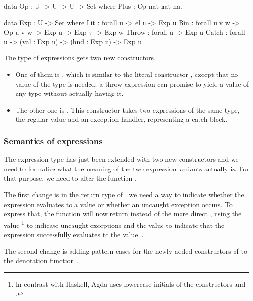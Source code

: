 \begin{code}
  data Op : U -> U -> U -> Set where
    Plus : Op nat nat nat
\end{code}

\begin{code}
  data Exp : U -> Set where
    Lit : forall {u} -> el u -> Exp u
    Bin : forall {u v w} -> Op u v w -> Exp u -> Exp v -> Exp w
    Throw : forall {u} -> Exp u
    Catch : forall {u} -> (val : Exp u) -> (hnd : Exp u) -> Exp u
\end{code}

\noindent The type of expressions gets two new constructors.
\begin{itemize}

  \item One of them is , which is similar to the literal
    constructor , except that no value of the type  is
    needed: a throw-expression can promise to yield a value of any type without
    actually having it.

  \item The other one is . This constructor takes two expressions of
    the same type, the regular value and an exception handler, representing a
    catch-block.

\end{itemize}

\subsubsection{Semantics of expressions}

The expression type has just been extended with two new constructors and we
need to formalize what the meaning of the two expression variants actually is.
For that purpose, we need to alter the function .

The first change is in the return type of : we need a way to
indicate whether the expression evaluates to a value or whether an uncaught
exception occurs. To express that, the function  will now return
 instead of the more direct , using the value
\footnote{In contrast with Haskell, Agda uses lowercase initials
of the constructors  and .} to indicate uncaught
exceptions and the value  to indicate that the expression
successfully evaluates to the value~.

The second change is adding pattern cases for the newly added constructors
of  to the denotation function .

